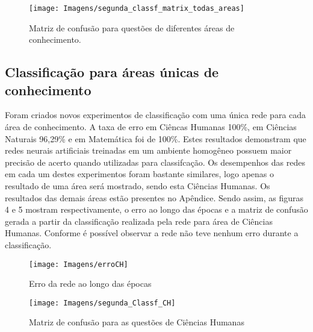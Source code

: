 \documentclass[article,	12pt,	oneside, a4paper,	english, brazil, sumario=tradicional, section=TITLE]{abntex2}
\begin{document}
\begin{figure}[h]
\caption{Matriz de confusão para questões de diferentes áreas de conhecimento.}\label{fig3}\vspace{-0.5cm}
\begin{center}
\texttt{[image: Imagens/segunda\_classf\_matrix\_todas\_areas]}\par
{}%
\end{center}
\end{figure}

\subsection{Classificação para áreas únicas de conhecimento}
Foram criados novos experimentos de classificação com uma única rede para cada área de conhecimento. A taxa de erro em Ciêncas Humanas 100\%, em Ciências Naturais 96,29\% e em Matemática foi de 100\%. Estes resultados demonstram que redes neurais artificiais treinadas em um ambiente homogêneo possuem maior precisão de acerto quando utilizadas para classifcação. Os desempenhos das redes em cada um destes experimentos foram bastante similares, logo apenas o resultado de uma área será mostrado, sendo esta Ciências Humanas. Os resultados das demais áreas estão presentes no Apêndice. Sendo assim, as figuras 4 e 5 mostram respectivamente, o erro ao longo das épocas e a matriz de confusão gerada a partir da classificação realizada pela rede para área de Ciências Humanas. Conforme é possível observar a rede não teve nenhum erro durante a classificação.

\begin{figure}[h]
\caption{Erro da rede ao longo das épocas}\label{fig4}\vspace{-0.5cm}
\begin{center}
\texttt{[image: Imagens/erroCH]}\par
{}%
\end{center}
\end{figure}

\begin{figure}[h]
\caption{Matriz de confusão para as questões de Ciências Humanas}\label{fig5}\vspace{-0.5cm}
\begin{center}
\texttt{[image: Imagens/segunda\_Classf\_CH]}\par
{}%
\end{center}
\end{figure}
\end{document}
